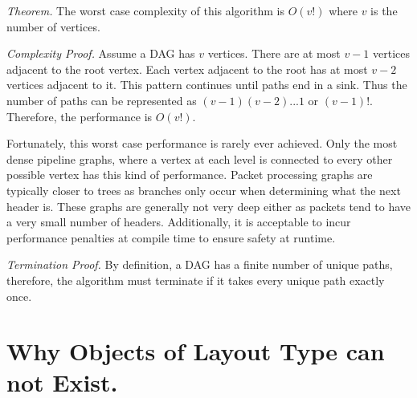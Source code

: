\textit{Theorem.} The worst case complexity of this algorithm is $O(v!)$ where $v$ is the number of vertices.

\textit{Complexity Proof.}  Assume a DAG has $v$ vertices. There are at most $v-1$ vertices adjacent to the root vertex. Each vertex adjacent to the root has at most $v-2$ vertices adjacent to it. This pattern continues until paths end in a sink. Thus the number of paths can be represented as $(v-1)(v-2)...1$ or $(v-1)!$. Therefore, the performance
is $O(v!)$.

Fortunately, this worst case performance is rarely ever achieved. Only the most dense pipeline graphs, where a vertex at each level is connected to every other possible vertex has this kind of performance. Packet processing graphs are typically closer to trees as branches only occur when determining what the next header is. These graphs are generally not very deep either as packets tend to have a very small number of headers.
Additionally, it is acceptable to incur performance penalties at compile time
to ensure safety at runtime.

\textit{Termination Proof.} By definition, a DAG has a finite number of unique paths, therefore, the algorithm must terminate if it takes every unique path exactly once.
%
%

\section{Why Objects of Layout Type can not Exist.} \label{guide:no_dst}

